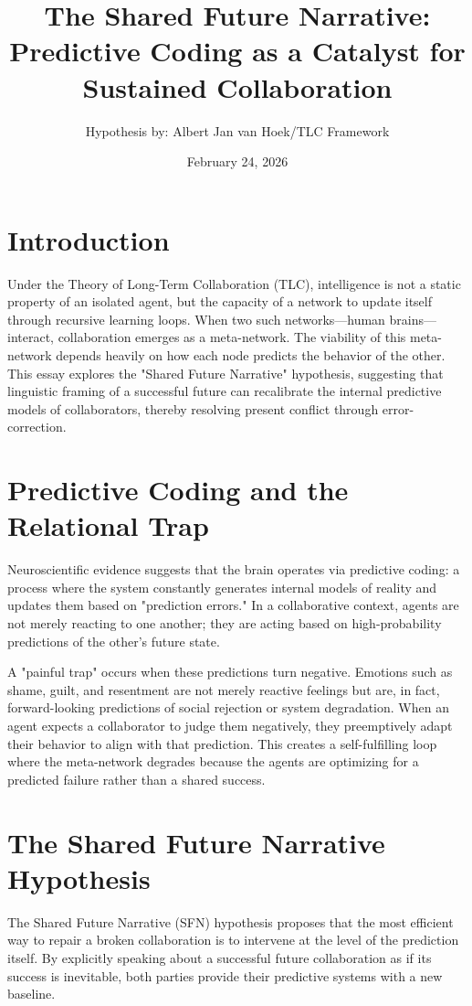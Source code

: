 \documentclass[11pt]{article}
\title{\textbf{The Shared Future Narrative: \\ Predictive Coding as a Catalyst for Sustained Collaboration}}
\author{Hypothesis by: Albert Jan van Hoek/TLC Framework}
\date{February 24, 2026}
\begin{document}
\maketitle

\section{Introduction}
Under the Theory of Long-Term Collaboration (TLC), intelligence is not a static property of an isolated agent, but the capacity of a network to update itself through recursive learning loops. When two such networks—human brains—interact, collaboration emerges as a meta-network. The viability of this meta-network depends heavily on how each node predicts the behavior of the other. This essay explores the "Shared Future Narrative" hypothesis, suggesting that linguistic framing of a successful future can recalibrate the internal predictive models of collaborators, thereby resolving present conflict through error-correction.

\section{Predictive Coding and the Relational Trap}
Neuroscientific evidence suggests that the brain operates via predictive coding: a process where the system constantly generates internal models of reality and updates them based on "prediction errors." In a collaborative context, agents are not merely reacting to one another; they are acting based on high-probability predictions of the other's future state.

A "painful trap" occurs when these predictions turn negative. Emotions such as shame, guilt, and resentment are not merely reactive feelings but are, in fact, forward-looking predictions of social rejection or system degradation. When an agent expects a collaborator to judge them negatively, they preemptively adapt their behavior to align with that prediction. This creates a self-fulfilling loop where the meta-network degrades because the agents are optimizing for a predicted failure rather than a shared success.

\section{The Shared Future Narrative Hypothesis}
The Shared Future Narrative (SFN) hypothesis proposes that the most efficient way to repair a broken collaboration is to intervene at the level of the prediction itself. By explicitly speaking about a successful future collaboration as if its success is inevitable, both parties provide their predictive systems with a new baseline.
\end{document}

